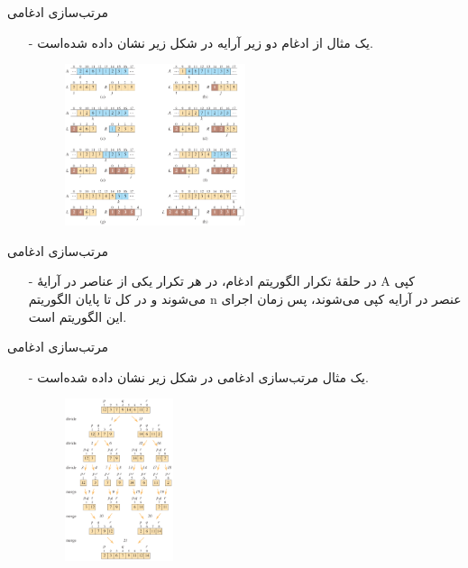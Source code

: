 \begin{frame}{‌مرتب‌سازی ادغامی}
\begin{itemize}\itemr
\item[-]
یک مثال از ادغام دو زیر آرایه در شکل زیر نشان داده شده‌است.
\begin{figure}
\includegraphics[width=0.5\textwidth]{figs/chap03/merge-example}
\end{figure}
\end{itemize}
\end{frame}


\begin{frame}{‌مرتب‌سازی ادغامی}
\begin{itemize}\itemr
\item[-]
در حلقهٔ تکرار الگوریتم ادغام، در هر تکرار یکی از عناصر در آرایهٔ A کپی می‌شوند و در کل تا پایان الگوریتم n عنصر در آرایه کپی می‌شوند، پس زمان اجرای این الگوریتم
است.
\end{itemize}
\end{frame}


\begin{frame}{‌مرتب‌سازی ادغامی}
\begin{itemize}\itemr
\item[-]
یک مثال مرتب‌سازی ادغامی در شکل زیر نشان داده شده‌است.
\begin{figure}
\includegraphics[width=0.3\textwidth]{figs/chap03/merge-sort-example}
\end{figure}
\end{itemize}
\end{frame}


